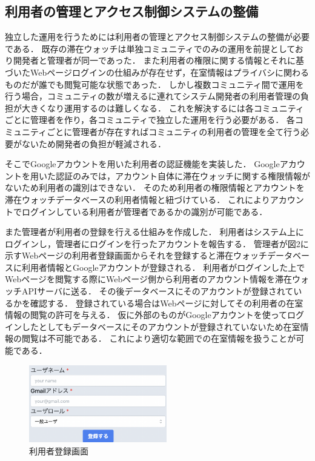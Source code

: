 
\subsection{利用者の管理とアクセス制御システムの整備}
独立した運用を行うためには利用者の管理とアクセス制御システムの整備が必要である．
既存の滞在ウォッチは単独コミュニティでのみの運用を前提としており開発者と管理者が同一であった．
また利用者の権限に関する情報とそれに基づいたWebページログインの仕組みが存在せず，在室情報はプライバシに関わるものだが誰でも閲覧可能な状態であった．
しかし複数コミュニティ間で運用を行う場合，コミュニティの数が増えるに連れてシステム開発者の利用者管理の負担が大きくなり運用するのは難しくなる．
これを解決するには各コミュニティごとに管理者を作り，各コミュニティで独立した運用を行う必要がある．
各コミュニティごとに管理者が存在すればコミュニティの利用者の管理を全て行う必要がないため開発者の負担が軽減される．

そこでGoogleアカウントを用いた利用者の認証機能を実装した．
Googleアカウントを用いた認証のみでは，アカウント自体に滞在ウォッチに関する権限情報がないため利用者の識別はできない．
そのため利用者の権限情報とアカウントを滞在ウォッチデータベースの利用者情報と紐づけている．
これによりアカウントでログインしている利用者が管理者であるかの識別が可能である．

また管理者が利用者の登録を行える仕組みを作成した．
利用者はシステム上にログインし，管理者にログインを行ったアカウントを報告する．
管理者が図2に示すWebページの利用者登録画面からそれを登録すると滞在ウォッチデータベースに利用者情報とGoogleアカウントが登録される．
利用者がログインした上でWebページを閲覧する際にWebページ側から利用者のアカウント情報を滞在ウォッチAPIサーバに送る．
その後データベースにそのアカウントが登録されているかを確認する．
登録されている場合はWebページに対してその利用者の在室情報の閲覧の許可を与える．
仮に外部のものがGoogleアカウントを使ってログインしたとしてもデータベースにそのアカウントが登録されていないため在室情報の閲覧は不可能である．
これにより適切な範囲での在室情報を扱うことが可能である．


\begin{figure}[tbh]
  \centering
  \includegraphics[width=6cm]{image/register.png}
  \caption{利用者登録画面}
  \label{multipleBPM}
\end{figure}